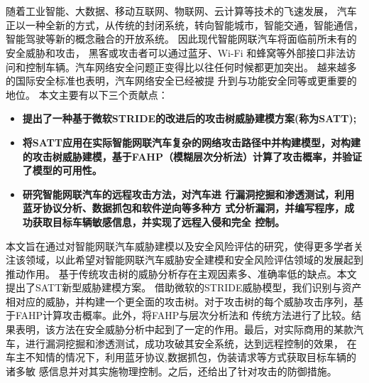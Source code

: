 \vspace{-2.5cm}
\chapter*{\xiaosan {}}
\hspace{-0.5cm}
随着工业智能、大数据、移动互联网、物联网、云计算等技术的飞速发展，
汽车正以一种全新的方式，从传统的封闭系统，转向智能城市，智能交通，智能通信，智能驾驶等新的概念融合的开放系统。
因此现代智能网联汽车将面临前所未有的安全威胁和攻击，
黑客或攻击者可以通过蓝牙、Wi-Fi 和蜂窝等外部接口非法访问和控制车辆。汽车网络安全问题正变得比以往任何时候都更加突出。
越来越多的国际安全标准也表明，汽车网络安全已经被提
升到与功能安全同等或更重要的地位。
本文主要有以下三个贡献点：
\begin{itemize}
    \item \textbf{提出了一种基于微软STRIDE的改进后的攻击树威胁建模方案(称为SATT);}
    \item \textbf{将SATT应用在实际智能网联汽车复杂的网络攻击路径中并构建模型，对构建的攻击树威胁建模，基于FAHP（模糊层次分析法）计算了攻击概率，并验证了模型的可用性。}
    \item \textbf{研究智能网联汽车的远程攻击方法，对汽车进
    行漏洞挖掘和渗透测试，利用蓝牙协议分析、数据抓包和软件逆向等多种方
    式分析漏洞，并编写程序，成功获取目标车辆敏感信息，并实现了远程入侵和完全
    控制。}    
  \end{itemize}
本文旨在通过对智能网联汽车威胁建模以及安全风险评估的研究，使得更多学者关注该领域，以此希望对智能网联汽车威胁安全建模和安全风险评估领域的发展起到推动作用。
基于传统攻击树的威胁分析存在主观因素多、准确率低的缺点。本文提出了SATT新型威胁建模方案。
借助微软的STRIDE威胁模型，我们识别与资产相对应的威胁，并构建一个更全面的攻击树。对于攻击树的每个威胁攻击序列，基于FAHP计算攻击概率。此外，将FAHP与层次分析法和
传统方法进行了比较。结果表明，该方法在安全威胁分析中起到了一定的作用。最后，对实际商用的某款汽车，进行漏洞挖掘和渗透测试，成功攻破其安全系统，达到远程控制的效果，
在车主不知情的情况下，利用蓝牙协议,数据抓包，伪装请求等方式获取目标车辆的诸多敏
感信息并对其实施物理控制。之后，还给出了针对攻击的防御措施。


 